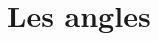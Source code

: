 \themaG
\graphicspath{{../../S02_Les_angles/Images/}}

\chapter{Les angles}
\label{S02}
%
%
%
%
%
%
%
%
